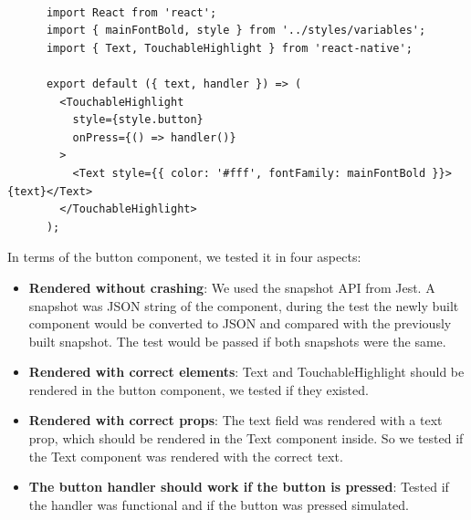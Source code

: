 \documentclass[12pt,a4paper]{article}
\begin{document}
          \begin{lstlisting}[caption=Button.jsx, label={lst:Button.jsx}]

      import React from 'react';
      import { mainFontBold, style } from '../styles/variables';
      import { Text, TouchableHighlight } from 'react-native';

      export default ({ text, handler }) => (
        <TouchableHighlight
          style={style.button}
          onPress={() => handler()}
        >
          <Text style={{ color: '#fff', fontFamily: mainFontBold }}>{text}</Text>
        </TouchableHighlight>
      );

          \end{lstlisting}
        
          In terms of the button component, we tested it in four aspects: 
          \begin{itemize}
            \setlength\itemsep{0em}
            \item{\bf Rendered without crashing}: We used the snapshot API from Jest. A snapshot was JSON string of the component, during the test the newly built component would be converted to JSON and compared with the previously built snapshot. The test would be passed if both snapshots were the same.  
            \item{\bf Rendered with correct elements}: Text and TouchableHighlight should be rendered in the button component, we tested if they existed.
            \item{\bf Rendered with correct props}: The text field was rendered with a text prop, which should be rendered in the Text component inside. So we tested if the Text component was rendered with the correct text.
            \item{\bf The button handler should work if the button is pressed}: Tested if the handler was functional and if the button was pressed simulated.
          \end{itemize} 
\end{document}
